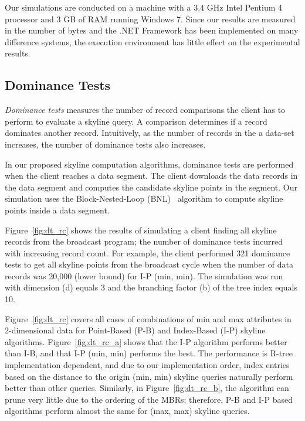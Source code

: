Our simulations are conducted on a machine with a 3.4 GHz Intel
Pentium 4 processor and 3 GB of RAM running Windows 7. Since our
results are measured in the number of bytes and the .NET Framework
has been implemented on many difference systems, the execution
environment has little effect on the experimental results.

\subsection{Dominance Tests}\label{sec:exp_dom_test}

\emph{Dominance tests} measures the number of record comparisons
the client has to perform to evaluate a skyline query. A
comparison determines if a record dominates another record.
Intuitively, as the number of records in the a data-set increases,
the number of dominance tests also increases.

In our proposed skyline computation algorithms, dominance tests
are performed when the client reaches a data segment. The client
downloads the data records in the data segment and computes the
candidate skyline points in the segment. Our simulation uses the
Block-Nested-Loop (BNL)~\cite{conf/icde/BorzsonyiKS01} algorithm
to compute skyline points inside a data segment.

Figure~\ref{fig:dt_rc} shows the results of simulating a client
finding all skyline records from the broadcast program; the number
of dominance tests incurred with increasing record count. For
example, the client performed 321 dominance tests to get all
skyline points from the broadcast cycle when the number of data
records was 20,000 (lower bound) for I-P (min, min). The
simulation was run with dimension (d) equals 3 and the branching
factor (b) of the tree index equals 10.

Figure~\ref{fig:dt_rc} covers all cases of combinations of min and
max attributes in 2-dimensional data for Point-Based (P-B) and
Index-Based (I-P) skyline algorithms. Figure~\ref{fig:dt_rc_a}
shows that the I-P algorithm performs better than I-B, and that
I-P (min, min) performs the best. The performance is R-tree
implementation dependent, and due to our implementation order,
index entries based on the distance to the origin (min, min)
skyline queries naturally perform better than other queries.
Similarly, in Figure~\ref{fig:dt_rc_b}, the algorithm can prune
very little due to the ordering of the MBRs; therefore, P-B and
I-P based algorithms perform almost the same for (max, max)
skyline queries.

